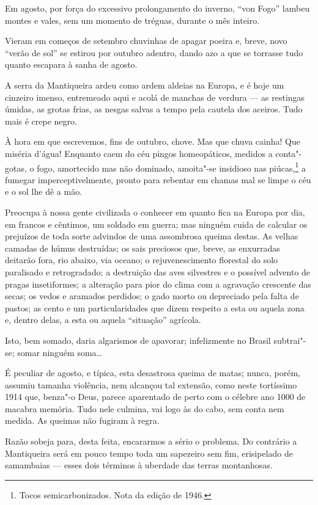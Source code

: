 Em agosto, por força do excessivo prolongamento do inverno, ``von Fogo''
lambeu montes e vales, sem um momento de tréguas, durante o mês inteiro.

Vieram em começos de setembro chuvinhas de apagar poeira e, breve, novo
``verão de sol'' se estirou por outubro adentro, dando azo a que se
torrasse tudo quanto escapara à sanha de agosto.

A serra da Mantiqueira ardeu como ardem aldeias na Europa, e é hoje um
cinzeiro imenso, entremeado aqui e acolá de manchas de verdura --- as
restingas úmidas, as grotas frias, as nesgas salvas a tempo pela cautela
dos aceiros. Tudo mais é crepe negro.

À hora em que escrevemos, fins de outubro, chove. Mas que chuva cainha!
Que miséria d'água! Enquanto caem do céu pingos homeopáticos, medidos a
conta"-gotas, o fogo, amortecido mas não dominado, amoita"-se insidioso
nas piúcas,\footnote{Tocos semicarbonizados. Nota da edição de 1946.} a
fumegar imperceptivelmente, pronto para rebentar em chamas mal se limpe
o céu e o sol lhe dê a mão.

Preocupa à nossa gente civilizada o conhecer em quanto fica na Europa
por dia, em francos e cêntimos, um soldado em guerra; mas ninguém cuida
de calcular os prejuízos de toda sorte advindos de uma assombrosa queima
destas. As velhas camadas de húmus destruídas; os sais preciosos que,
breve, as enxurradas deitarão fora, rio abaixo, via oceano; o
rejuvenescimento florestal do solo paralisado e retrogradado; a
destruição das aves silvestres e o possível advento de pragas
insetiformes; a alteração para pior do clima com a agravação crescente
das secas; os vedos e aramados perdidos; o gado morto ou depreciado pela
falta de pastos; as cento e um particularidades que dizem respeito a
esta ou aquela zona e, dentro delas, a esta ou aquela ``situação''
agrícola.

Isto, bem somado, daria algarismos de apavorar; infelizmente no Brasil
subtrai"-se; somar ninguém soma\ldots{}

É peculiar de agosto, e típica, esta desastrosa queima de matas; nunca,
porém, assumiu tamanha violência, nem alcançou tal extensão, como neste
tortíssimo 1914 que, benza"-o Deus, parece aparentado de perto com o
célebre ano 1000 de macabra memória. Tudo nele culmina, vai logo às do
cabo, sem conta nem medida. As queimas não fugiram à regra.

Razão sobeja para, desta feita, encararmos a sério o problema. Do
contrário a Mantiqueira será em pouco tempo toda um sapezeiro sem fim,
erisipelado de samambaias --- esses dois términos à uberdade das terras
montanhosas.

